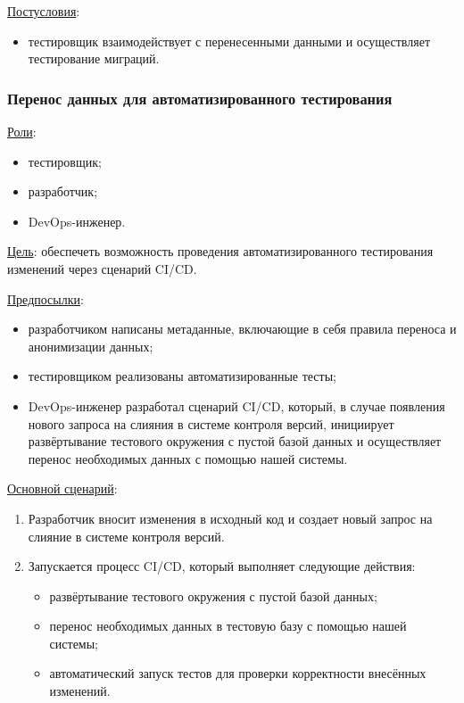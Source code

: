 \underline{Постусловия}:

\begin{itemize}
    \item тестировщик взаимодействует с перенесенными данными и осуществляет тестирование миграций.
\end{itemize}


\subsubsection{Перенос данных для автоматизированного тестирования}

\underline{Роли}:

\begin{itemize}
    \item тестировщик;
    \item разработчик;
    \item DevOps-инженер.
\end{itemize}

\underline{Цель}: обеспечеть возможность проведения автоматизированного тестирования изменений через сценарий CI/CD.

\underline{Предпосылки}:

\begin{itemize}
    \item разработчиком написаны метаданные, включающие в себя правила переноса и анонимизации данных;
    \item тестировщиком реализованы автоматизированные тесты;
    \item DevOps-инженер разработал сценарий CI/CD, который, в случае появления нового запроса на слияния в системе контроля версий, инициирует развёртывание тестового окружения с пустой базой данных и осуществляет перенос необходимых данных с помощью нашей системы.
\end{itemize}

\underline{Основной сценарий}:

\begin{enumerate}
    \item Разработчик вносит изменения в исходный код и создает новый запрос на слияние в системе контроля версий.
    \item Запускается процесс CI/CD, который выполняет следующие действия:
    \begin{itemize}
        \item развёртывание тестового окружения с пустой базой данных;
        \item перенос необходимых данных в тестовую базу с помощью нашей системы;
        \item автоматический запуск тестов для проверки корректности внесённых изменений.
    \end{itemize}
\end{enumerate}


